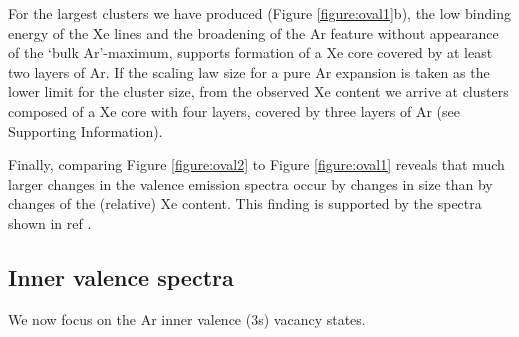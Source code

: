 \documentclass[journal=jpccck,manuscript=article]{achemso}
\begin{document}
For the largest clusters we have produced (Figure \ref{figure:oval1}b), the low binding energy of the Xe lines and the broadening of the Ar feature without appearance of the `bulk Ar'-maximum, supports formation of a Xe core covered by at least two layers of Ar.
If the scaling law size for a pure Ar expansion is taken as the lower limit for the cluster size, from the observed Xe content we arrive at clusters composed of a Xe core with four layers, covered by three layers of Ar (see Supporting Information).

Finally, comparing Figure \ref{figure:oval2} to Figure \ref{figure:oval1} reveals that much larger changes in the valence emission spectra occur by changes in size than by changes of the (relative) Xe content.
This finding is supported by the spectra shown in ref .
%
%
\subsection{Inner valence spectra}
%
We now focus on the Ar inner valence (3s) vacancy states. 
%
\end{document}
